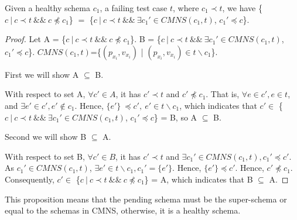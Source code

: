 \begin{proposition}\label{pro:superofCMNS}
Given a healthy schema $c_{1}$, a failing test case $t$, where $c_{1} \prec t$, we have \{$c\ |\ c \prec t\ \&\&\ c \npreceq c_{1}$\} $=$  \{$ c\ |\ c \prec t \  \&\& \ \exists c_{1}' \in CMNS(c_{1}, t)$, $c_{1}' \preceq c$\}.
\end{proposition}

\begin{proof}
Let A = \{$c\ |\ c \prec t\ \&\&\ c \npreceq c_{1}$\}. B = \{$ c\ |\ c \prec t \ \&\&\  \exists c_{1}' \in CMNS(c_{1}, t)$, $c_{1}' \preceq c$\}. $CMNS(c_{1},t)$=\{$(p_{x_{i}}, v_{x_{i}})$ | $(p_{x_{i}}, v_{x_{i}}) \in t \backslash c_{1} $\}.

First we will show A $\subseteq$ B.

With respect to set A, $\forall c' \in A$, it has $c' \prec t$ and $c' \npreceq c_{1}$. That is, $\forall e \in c', e \in t$, and  $\exists e' \in c', e' \not\in c_{1}$. Hence, $\{e'\}\ \preceq c',\  e' \in t \backslash c_{1}$, which indicates that $c' \in $ \{$ c\ |\ c \prec t \ \&\&\  \exists c_{1}' \in CMNS(c_{1}, t)$, $c_{1}' \preceq c$\} = B, so A $\subseteq$ B.


Second we will show B $\subseteq$ A.

With respect to set B, $\forall c' \in B$, it has $c' \prec t$  and $\exists c_{1}' \in CMNS(c_{1}, t), c_{1}' \preceq c'$. As $c_{1}' \in CMNS(c_{1}, t)$, $\exists e' \in  t \backslash c_{1}, c_{1}' = \{ e' \}$. Hence, $\{e'\} \preceq c'$. Hence, $c' \npreceq c_{1}$. Consequently, $c' \in $  \{$c\ |\ c \prec t\ \&\&\ c \npreceq c_{1}$\} = A, which indicates that B $\subseteq$ A.

\end{proof}


This proposition means that the pending schema must be the super-schema or equal to the schemas in CMNS, otherwise, it is a healthy schema.

